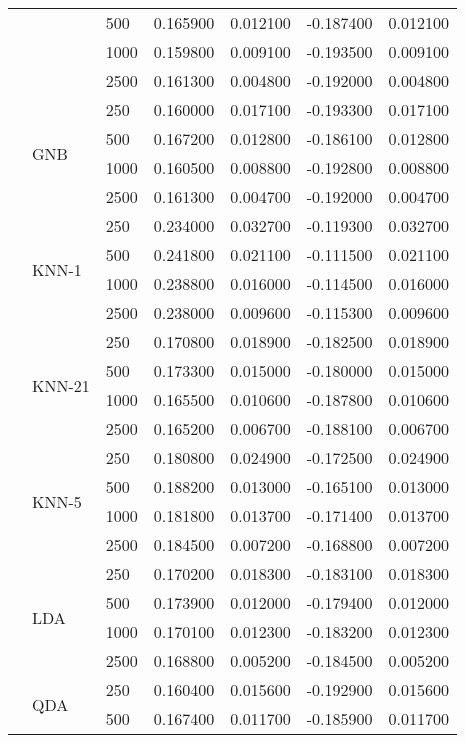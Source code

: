 \begin{tabular}{lllrrrr}
 &  & 500 & 0.165900 & 0.012100 & -0.187400 & 0.012100 \\
 &  & 1000 & 0.159800 & 0.009100 & -0.193500 & 0.009100 \\
 &  & 2500 & 0.161300 & 0.004800 & -0.192000 & 0.004800 \\
\cline{2-7}
 & \multirow[t]{4}{*}{GNB} & 250 & 0.160000 & 0.017100 & -0.193300 & 0.017100 \\
 &  & 500 & 0.167200 & 0.012800 & -0.186100 & 0.012800 \\
 &  & 1000 & 0.160500 & 0.008800 & -0.192800 & 0.008800 \\
 &  & 2500 & 0.161300 & 0.004700 & -0.192000 & 0.004700 \\
\cline{2-7}
 & \multirow[t]{4}{*}{KNN-1} & 250 & 0.234000 & 0.032700 & -0.119300 & 0.032700 \\
 &  & 500 & 0.241800 & 0.021100 & -0.111500 & 0.021100 \\
 &  & 1000 & 0.238800 & 0.016000 & -0.114500 & 0.016000 \\
 &  & 2500 & 0.238000 & 0.009600 & -0.115300 & 0.009600 \\
\cline{2-7}
 & \multirow[t]{4}{*}{KNN-21} & 250 & 0.170800 & 0.018900 & -0.182500 & 0.018900 \\
 &  & 500 & 0.173300 & 0.015000 & -0.180000 & 0.015000 \\
 &  & 1000 & 0.165500 & 0.010600 & -0.187800 & 0.010600 \\
 &  & 2500 & 0.165200 & 0.006700 & -0.188100 & 0.006700 \\
\cline{2-7}
 & \multirow[t]{4}{*}{KNN-5} & 250 & 0.180800 & 0.024900 & -0.172500 & 0.024900 \\
 &  & 500 & 0.188200 & 0.013000 & -0.165100 & 0.013000 \\
 &  & 1000 & 0.181800 & 0.013700 & -0.171400 & 0.013700 \\
 &  & 2500 & 0.184500 & 0.007200 & -0.168800 & 0.007200 \\
\cline{2-7}
 & \multirow[t]{4}{*}{LDA} & 250 & 0.170200 & 0.018300 & -0.183100 & 0.018300 \\
 &  & 500 & 0.173900 & 0.012000 & -0.179400 & 0.012000 \\
 &  & 1000 & 0.170100 & 0.012300 & -0.183200 & 0.012300 \\
 &  & 2500 & 0.168800 & 0.005200 & -0.184500 & 0.005200 \\
\cline{2-7}
 & \multirow[t]{4}{*}{QDA} & 250 & 0.160400 & 0.015600 & -0.192900 & 0.015600 \\
 &  & 500 & 0.167400 & 0.011700 & -0.185900 & 0.011700 \\

\end{tabular}
